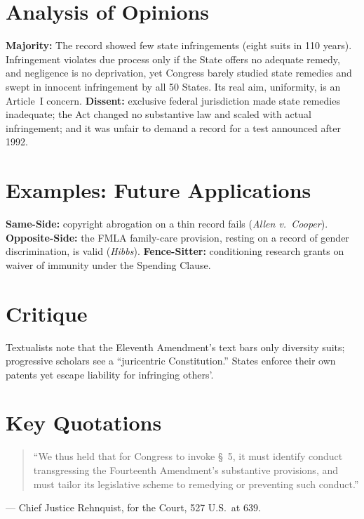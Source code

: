 \documentclass[12pt]{article}
\begin{document}
\section{Analysis of Opinions}
\textbf{Majority:} The record showed few state infringements (eight suits in 110 years). Infringement violates due process only if the State offers no adequate remedy, and negligence is no deprivation, yet Congress barely studied state remedies and swept in innocent infringement by all 50 States. Its real aim, uniformity, is an Article~I concern. \textbf{Dissent:} exclusive federal jurisdiction made state remedies inadequate; the Act changed no substantive law and scaled with actual infringement; and it was unfair to demand a record for a test announced after 1992.

\section{Examples: Future Applications}
\textbf{Same-Side:} copyright abrogation on a thin record fails (\textit{Allen v.\ Cooper}). \textbf{Opposite-Side:} the FMLA family-care provision, resting on a record of gender discrimination, is valid (\textit{Hibbs}). \textbf{Fence-Sitter:} conditioning research grants on waiver of immunity under the Spending Clause.

\section{Critique}
Textualists note that the Eleventh Amendment's text bars only diversity suits; progressive scholars see a ``juricentric Constitution.'' States enforce their own patents yet escape liability for infringing others'.

\section{Key Quotations}
\begin{quote}
``We thus held that for Congress to invoke \S~5, it must identify conduct transgressing the Fourteenth Amendment's substantive provisions, and must tailor its legislative scheme to remedying or preventing such conduct.''
\end{quote}
\noindent --- Chief Justice Rehnquist, for the Court, 527 U.S.\ at 639.
\end{document}
